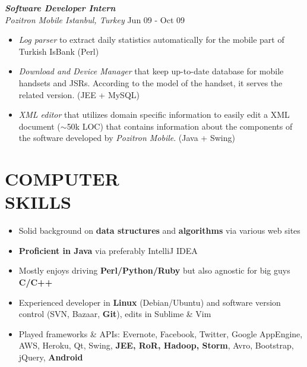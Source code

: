 \documentclass[line, margin]{res}
\begin{document}
\begin{resume}
				{\sl \textbf{Software Developer Intern} \\ Pozitron Mobile Istanbul, Turkey} \hfill Jun 09 - Oct 09\\
				\vspace{-0.3cm}
				\begin{itemize} \itemsep -2pt
					\item \textit{Log parser} to extract daily statistics automatically for the mobile part of Turkish IsBank (Perl)
					\item \textit{Download and Device Manager} that keep up-to-date database for mobile handsets  and JSRs. According to the model of the handset, it serves the related version. (JEE + MySQL)
					\item \textit{XML editor} that utilizes domain specific information to easily edit a XML document ($\sim$50k LOC) that contains information about the components of the software developed by \textit{Pozitron Mobile}. (Java + Swing)
				\end{itemize}

\section{COMPUTER \\ SKILLS} 
				\begin{itemize}
				\item Solid background on \textbf{data structures} and \textbf{algorithms} via various web sites
				\item \textbf{Proficient in Java} via preferably IntelliJ IDEA
				\item Mostly enjoys driving \textbf{Perl/Python/Ruby} but also agnostic for big guys \textbf{C/C++}
				\item Experienced developer in \textbf{Linux} (Debian/Ubuntu) and software version control (SVN, Bazaar, \textbf{Git}), edits in Sublime \& Vim
				\item Played frameworks \& APIs: Evernote, Facebook, Twitter, Google AppEngine, AWS, Heroku, Qt, Swing,  \textbf{JEE, RoR, Hadoop, Storm}, Avro, Bootstrap, jQuery, \textbf{Android}
				\end{itemize}

\end{resume}
\end{document}
